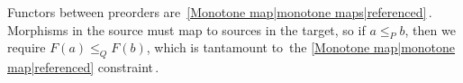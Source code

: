 
Functors between preorders are \,\ref{Monotone map|monotone maps|referenced}\,. Morphisms in the source must map to sources in the target, so if $a \leq_P b$, then we require $F(a) \leq_Q F(b)$, which is tantamount to \,the \ref{Monotone map|monotone map|referenced} constraint\,.
